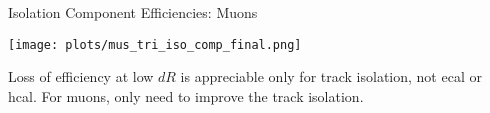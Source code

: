 \documentclass{beamer}
\begin{document}
\begin{frame}{Isolation Component Efficiencies: Muons}%
    
  \begin{center}
    \vspace{-0.2cm}
    \texttt{[image: plots/mus\_tri\_iso\_comp\_final.png]}
    
    

    
  Loss of efficiency at low $dR$ is appreciable only for track isolation, not ecal or hcal. For muons, only need to improve the track isolation.
  \end{center}
\end{frame}
\end{document}
